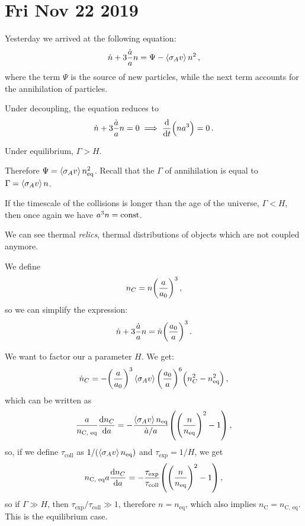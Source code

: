 \documentclass[main.tex]{subfiles}
\begin{document}
\section*{Fri Nov 22 2019}

Yesterday we arrived at the following equation: 
%
\begin{align}
  \dot{n} + 3 \frac{\dot{a}}{a} n = \Psi - \expval{\sigma_A v} n^2
\,,
\end{align}
%
where the term \(\Psi \) is the source of new particles, while the next term accounts for the annihilation of particles. 

Under decoupling, the equation reduces to 
%
\begin{align}
  \dot{n} + 3 \frac{\dot{a}}{a} n = 0 \implies \dv{}{t} \qty(n a^3) = 0 
\,.
\end{align}
%

Under equilibrium, \(\Gamma > H\).

Therefore \(\Psi = \expval{\sigma _A v} n^2 _{\text{eq}}\). 
Recall that the \(\Gamma \) of annihilation is equal to \(\Gamma  = \expval{\sigma _A v} n\). 

If the timescale of the collisions is longer than the age of the universe, \(\Gamma < H\), then once again we have \(a^3n = \text{const}\). 

We can see thermal \emph{relics}, thermal distributions of objects which are not coupled anymore. 

We define 
%
\begin{align}
  n_C = n \qty(\frac{a}{a_0 })^3
\,,
\end{align}
%
so we can simplify the expression: 
%
\begin{align}
  \dot{n} + 3 \frac{\dot{a}}{a} n = \dot{n} \qty(\frac{a_0 }{a})^3
\,.
\end{align}

We want to factor our a parameter \(H\). We get: 
%
\begin{align}
  \dot{n}_C = - \qty(\frac{a }{a_0 })^3
  \expval{\sigma _A v } \qty(\frac{a_0 }{a})^6 \qty(n_C^2-n^2 _{\text{eq}})
\,,
\end{align}
%
which can be written as 
%
\begin{align}
  \frac{a}{n _{\text{C, eq}}} \dv{n_C}{a} = - \frac{\expval{\sigma _A v }n _{\text{eq}}}{\dot{a}/a} \qty(\qty(\frac{n}{n _{\text{eq}}})^2- 1)
\,,
\end{align}
%
so, if we define \(\tau _{\text{coll}}\) as \(1 / (\expval{\sigma _A v} n _{\text{eq}})\) and \(\tau _{\text{exp}} = 1/H\), we get 
%
\begin{align}
  n _{\text{C, eq}} a \dv{n_C}{a}
  = - \frac{\tau _{\text{exp}}}{\tau _{\text{coll}}} \qty(\qty(\frac{n}{n _{\text{eq}}})^2 -1 )
\,,
\end{align}
%
so if \(\Gamma \gg H\), then \(\tau _{\text{exp}} / \tau _{\text{coll}} \gg 1\), therefore \(n = n _{\text{eq}}\), which also implies \(n _{\text{C}} = n _{\text{C, eq}}\). This is the equilibrium case. 
\end{document}
